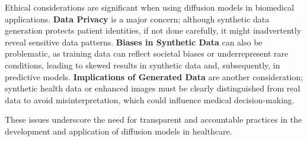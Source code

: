 \documentclass[12pt]{article}
\begin{document}
Ethical considerations are significant when using diffusion models in biomedical applications. \textbf{Data Privacy} is a major concern; although synthetic data generation protects patient identities, if not done carefully, it might inadvertently reveal sensitive data patterns. \textbf{Biases in Synthetic Data} can also be problematic, as training data can reflect societal biases or underrepresent rare conditions, leading to skewed results in synthetic data and, subsequently, in predictive models. \textbf{Implications of Generated Data} are another consideration; synthetic health data or enhanced images must be clearly distinguished from real data to avoid misinterpretation, which could influence medical decision-making.

These issues underscore the need for transparent and accountable practices in the development and application of diffusion models in healthcare.
\end{document}
